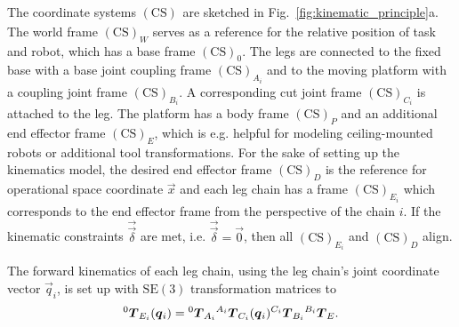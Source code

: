 \documentclass[
	graybox,
	vecphys] %
	{svmult}
\newcommand{\ks}[1]{{(\mathrm{CS})}_{#1}}
\newcommand{\trmat}[2]{{{ }^{#1}\boldsymbol{T}}_{#2}}
\newcommand{\Res}[0]{\vec{\delta}}
\begin{document}
The coordinate systems $\ks{}$ are sketched in Fig.~\ref{fig:kinematic_principle}a.
The world frame $\ks{W}$ serves as a reference for the relative position of task and robot, which has a base frame $\ks{0}$.
The legs are connected to the fixed base with a base joint coupling frame $\ks{A_i}$ and to the moving platform with a coupling joint frame $\ks{B_i}$.
A corresponding cut joint frame $\ks{C_i}$ is attached to the leg.
The platform has a body frame $\ks{P}$ and an additional end effector frame $\ks{E}$, which is e.g. helpful for modeling ceiling-mounted robots or additional tool transformations.
For the sake of setting up the kinematics model, the desired end effector frame $\ks{D}$ is the reference for operational space coordinate $\vec{x}$ and each leg chain has a frame $\ks{E_i}$ which corresponds to the end effector frame from the perspective of the chain $i$.
If the kinematic constraints $\vec{\Res}$ are met, i.e. $\vec{\Res}=\vec{0}$, then all $\ks{E_i}$ and $\ks{D}$ align.

The forward kinematics of each leg chain, using the leg chain's joint coordinate vector $\vec{q}_i$, is set up with $\mathrm{SE(3)}$ transformation matrices to
%
\vspace{-0.1cm}
\begin{equation}
\trmat{0}{E_i}(\vec{q}_i)=\trmat{0}{A_i} \trmat{A_i}{C_i}(\vec{q}_i)  \trmat{C_i}{B_i} \trmat{B_i}{E}.
\label{eq:fkine_leg}
\vspace{-0.1cm}
\end{equation}
\end{document}
